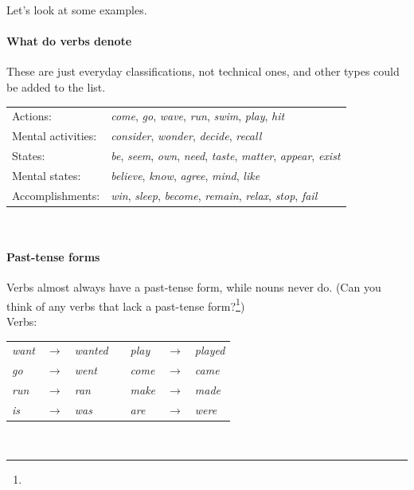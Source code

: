 Let's look at some examples.

\paragraph*{What do verbs denote}
These are just everyday classifications, not technical ones, and other types could be added to the list.\\

\begin{tabular}{@{} l l}
    Actions: & \textit{come}, \textit{go}, \textit{wave}, \textit{run}, \textit{swim}, \textit{play}, \textit{hit} \\
    Mental activities: & \textit{consider}, \textit{wonder}, \textit{decide}, \textit{recall} \\
    States: & \textit{be}, \textit{seem}, \textit{own}, \textit{need}, \textit{taste}, \textit{matter}, \textit{appear}, \textit{exist} \\
    Mental states: & \textit{believe}, \textit{know}, \textit{agree}, \textit{mind}, \textit{like} \\
    Accomplishments: & \textit{win}, \textit{sleep}, \textit{become}, \textit{remain}, \textit{relax}, \textit{stop}, \textit{fail}
\end{tabular}\\

\paragraph*{Past-tense forms}\label{sec:past-forms}
Verbs almost always have a past-tense form, while nouns never do. (Can you think of any verbs that lack a past-tense form?\footnote{
})\\

Verbs:~~
\begin{tabular}{@{} l l l l l l l}
\textit{want} & $\rightarrow$ & \textit{wanted} && \textit{play} & $\rightarrow$ & \textit{played} \\
\textit{go} & $\rightarrow$ & \textit{went} && \textit{come} & $\rightarrow$ & \textit{came} \\
\textit{run} & $\rightarrow$ & \textit{ran} && \textit{make} & $\rightarrow$ & \textit{made} \\
\textit{is} & $\rightarrow$ & \textit{was} && \textit{are} & $\rightarrow$ & \textit{were} \\
\end{tabular}\\

